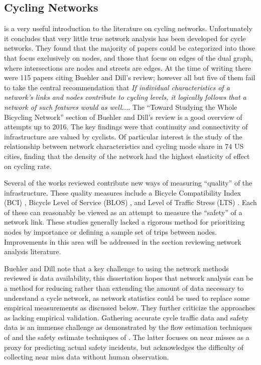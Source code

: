 \subsection{Cycling Networks}

\textcite{buehler2016bikeway} is a very useful introduction to the literature on cycling networks. Unfortunately it concludes that very little true network analysis has been developed for cycle networks. They found that the majority of papers could be categorized into those that focus exclusively on nodes, and those that focus on edges of the dual graph, where intersections are nodes and streets are edges. At the time of writing there were 115 papers citing Buehler and Dill's review; however all but five of them fail to take the central recommendation that \textit{If individual characteristics of a network's links and nodes contribute to cycling levels, it logically follows that a network of such features would as well...}. The ``Toward Studying the Whole Bicycling Network'' section of Buehler and Dill's review is a good overview of attempts up to 2016. The key findings were that continuity and connectivity of infrastructure are valued by cyclists. Of particular interest is the \textcite{schoner2014missing} study of the relationship between network characteristics and cycling mode share in 74 US cities, finding that the density of the network had the highest elasticity of effect on cycling rate. 

Several of the works reviewed contribute new ways of measuring ``quality'' of the infrastructure. These quality measures include a Bicycle Compatibility Index (BCI) \parencite{klobucar2007network},  Bicycle Level of Service (BLOS) \parencite{lowry2012assessment}, and Level of Traffic Stress (LTS) \parencite{mekuria2012low}. Each of these can reasonably be viewed as an attempt to measure the ``safety'' of a network link. These studies generally lacked a rigorous method for prioritizing nodes by importance or defining a sample set of trips between nodes. Improvements in this area will be addressed in the section reviewing network analysis literature. 

Buehler and Dill note that a key challenge to using the network methods reviewed is data availability, this dissertation hopes that network analysis can be a method for reducing rather than extending the amount of data necessary to understand a cycle network, as network statistics could be used to replace some empirical measurements as discussed below.  They further criticize the approaches as lacking empirical validation. Gathering accurate cycle traffic data and safety data is an immense challenge as demonstrated by the flow estimation techniques of \textcite{gosse2014estimating} and the safety estimate techniques of \textcite{puchades2018role}. The latter focuses on near misses as a proxy for predicting actual safety incidents, but acknowledges the difficulty of collecting near miss data without human observation. 


